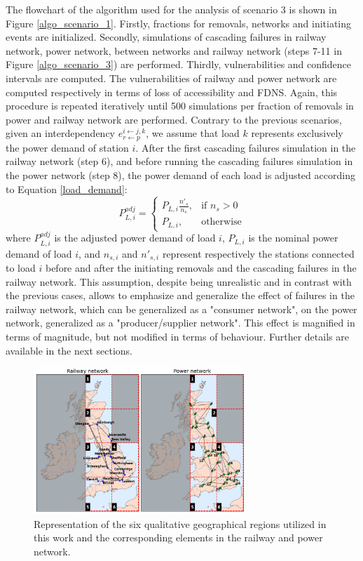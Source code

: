\documentclass[review]{elsarticle}
\begin{document}
    The flowchart of the algorithm used for the analysis of scenario 3 is shown in Figure \ref{algo_scenario_1}. Firstly, fractions for removals, networks and initiating events are initialized. Secondly, simulations of cascading failures in railway network, power network, between networks and railway network (steps 7-11 in Figure \ref{algo_scenario_3}) are performed. Thirdly, vulnerabilities and confidence intervals are computed. The vulnerabilities of railway and power network are computed respectively in terms of loss of accessibility and FDNS. Again, this procedure is repeated iteratively until 500 simulations per fraction of removals in power and railway network are performed. Contrary to the previous scenarios, given an interdependency $e^{i \leftarrow j,k}_{r\leftarrow p}$, we assume that load $k$ represents exclusively the power demand of station $i$. After the first cascading failures simulation in the railway network (step 6), and before running the cascading failures simulation in the power network (step 8), the power demand of each load is adjusted according to Equation \eqref{load_demand}:
\begin{equation}
P^{adj}_{L,i} =
  \begin{cases}
    P_{L,i} \frac{n'_s}{n_s}, & \text{if $n_s>0$} \\
    P_{L,i}, & \text{otherwise}
  \end{cases}
  \label{load_demand}
\end{equation}
	where $P^{adj}_{L,i}$ is the adjusted power demand of load $i$, $P_{L,i}$ is the nominal power demand of load $i$, and $n_{s,i}$ and $n'_{s,i}$ represent respectively the stations connected to load $i$ before and after the initiating removals and the cascading failures in the railway network. This assumption, despite being unrealistic and in contrast with the previous cases, allows to emphasize and generalize the effect of failures in the railway network, which can be generalized as a "consumer network", on the power network, generalized as a "producer/supplier network". This effect is magnified in terms of magnitude, but not modified in terms of behaviour. Further details are available in the next sections.
	
\begin{figure}[ht]
	\centering
	\includegraphics[width=8cm]{ images/regions_both.png}
	\caption{Representation of the six qualitative geographical regions utilized in this work and the corresponding elements in the railway and power network.}
	\label{regions}
\end{figure}
\end{document}
